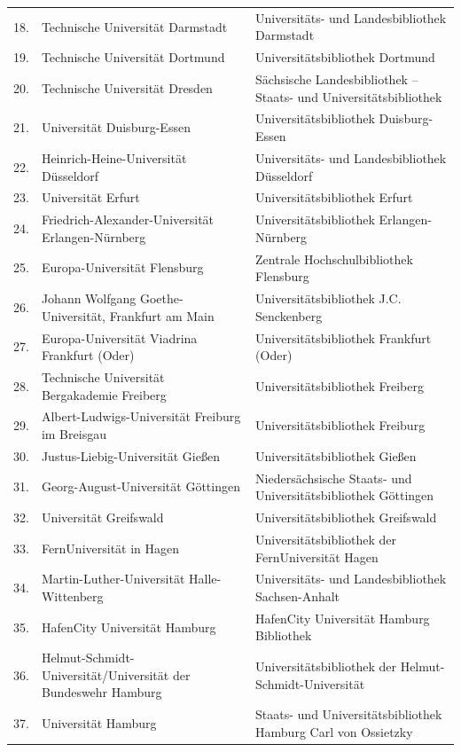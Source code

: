\documentclass[a4paper,
fontsize=11pt,
oneside,
numbers=noperiodatend,
parskip=half-,
bibliography=totoc,
final
]{scrartcl}
\begin{document}
\begin{longtable}[l]{rp{7cm}p{7.5cm}}
18. & Technische Universität Darmstadt & Universitäts- und Landesbibliothek Darmstadt \\
19. & Technische Universität Dortmund & Universitätsbibliothek Dortmund \\
20. & Technische Universität Dresden & Sächsische Landesbibliothek -- Staats- und Universitätsbibliothek \\
21. & Universität Duisburg-Essen & Universitätsbibliothek Duisburg-Essen \\
22. & Heinrich-Heine-Universität Düsseldorf & Universitäts- und Landesbibliothek Düsseldorf \\
23. & Universität Erfurt & Universitätsbibliothek Erfurt \\
24. & Friedrich-Alexander-Universität Erlangen-Nürnberg & Universitätsbibliothek Erlangen-Nürnberg \\
25. & Europa-Universität Flensburg & Zentrale Hochschulbibliothek Flensburg \\
26. & Johann Wolfgang Goethe-Universität, Frankfurt am Main & Universitätsbibliothek J.C. Senckenberg \\
27. & Europa-Universität Viadrina Frankfurt (Oder) & Universitätsbibliothek Frankfurt (Oder) \\
28. & Technische Universität Bergakademie Freiberg & Universitätsbibliothek Freiberg \\
29. & Albert-Ludwigs-Universität Freiburg im Breisgau & Universitätsbibliothek Freiburg \\
30. & Justus-Liebig-Universität Gießen & Universitätsbibliothek Gießen \\
31. & Georg-August-Universität Göttingen & Niedersächsische Staats- und Universitätsbibliothek Göttingen \\
32. & Universität Greifswald & Universitätsbibliothek Greifswald \\
33. & FernUniversität in Hagen & Universitätsbibliothek der FernUniversität Hagen \\
34. & Martin-Luther-Universität Halle-Wittenberg & Universitäts- und Landesbibliothek Sachsen-Anhalt \\
35. & HafenCity Universität Hamburg & HafenCity Universität Hamburg Bibliothek \\
36. & Helmut-Schmidt-Universität/Universität der Bundeswehr Hamburg & Universitätsbibliothek der Helmut-Schmidt-Universität \\
37. & Universität Hamburg & Staats- und Universitätsbibliothek Hamburg Carl von Ossietzky \\

\end{longtable}
\end{document}
